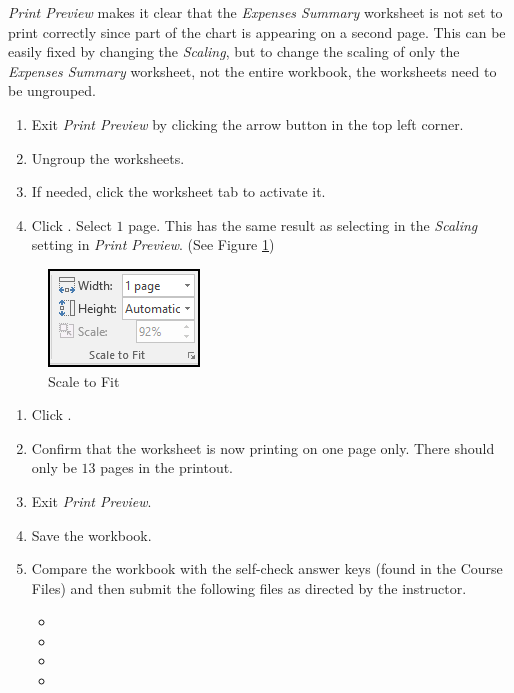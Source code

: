 \textit{Print Preview} makes it clear that the \textit{Expenses Summary} worksheet is not set to print correctly since part of the chart is appearing on a second page. This can be easily fixed by changing the \textit{Scaling}, but to change the scaling of only the \textit{Expenses Summary} worksheet, not the entire workbook, the worksheets need to be ungrouped.

\begin{enumerate}
	\item Exit \textit{Print Preview} by clicking the arrow button in the top left corner.
	\item Ungroup the worksheets.
	\item If needed, click the  worksheet tab to activate it.
	\item Click . Select $ 1 $ page. This has the same result as selecting  in the \textit{Scaling} setting in \textit{Print Preview}. (See Figure  \ref{06:fig16})
\end{enumerate}

\begin{figure}[H]
	\centering
	\includegraphics[width=\maxwidth{.35\linewidth}]{gfx/ch06_fig16}
	\caption{Scale to Fit}
	\label{06:fig16}
\end{figure}

\begin{enumerate}
	\item Click .
	\item Confirm that the  worksheet is now printing on one page only. There should only be $ 13 $ pages in the printout.
	\item Exit \textit{Print Preview}.
	\item Save the  workbook.
	\item Compare the workbook with the self-check answer keys (found in the Course Files) and then submit the following files as directed by the instructor.
	
	\begin{itemize}
		\item {}
		\item {}
		\item {}
		\item {}
	\end{itemize}

\end{enumerate}

